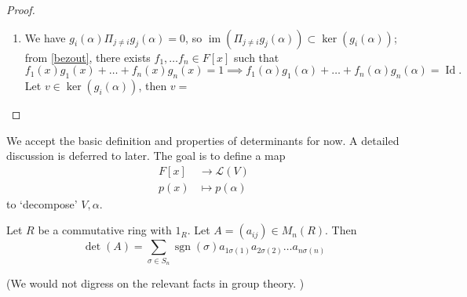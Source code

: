\documentclass{scrartcl}
\def\L{\mathcal{L}}
\DeclareMathOperator{\id}{Id}
\DeclareMathOperator{\im}{im}
\DeclareMathOperator{\sgn}{sgn}
\begin{document}
\begin{proof}
	\begin{enumerate}
		\item We have $g_i(\alpha)\Pi_{j \ne i}g_j(\alpha) = 0$, so $\im(\Pi_{j \ne i}g_j(\alpha)) \subset \ker(g_i(\alpha))$; from \ref{bezout}, there exists $f_1, \dots f_n \in F[x]$ such that 
		\[f_1(x)g_1(x) + \dots + f_n(x)g_n(x) = 1 \implies f_1(\alpha)g_1(\alpha) + \dots + f_n(\alpha)g_n(\alpha) = \id.\]
		Let $v \in \ker(g_i(\alpha))$, then $v = $
	\end{enumerate}
\end{proof}
\fi
We accept the basic definition and properties of determinants for now. A detailed discussion is deferred to later. The goal is to define a map
\begin{align*}
	F[x] &\to \L(V) \\
	p(x) &\mapsto p(\alpha)
\end{align*}
to `decompose' $V, \alpha$. 
\begin{definition}
	Let $R$ be a commutative ring with $1_R$. Let $A=(a_{ij}) \in M_n(R)$. Then 
	\[\det(A) = \sum_{\sigma \in S_n} \sgn(\sigma)a_{1\sigma(1)}a_{2\sigma(2)}\dots a_{n\sigma(n)}\]
\end{definition}
(We would not digress on the relevant facts in group theory. )
\end{document}
